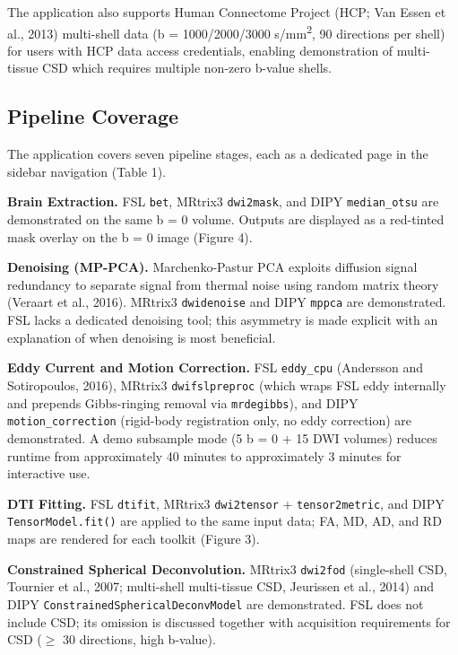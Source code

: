 \documentclass[12pt,a4paper]{article}
\begin{document}
The application also supports Human Connectome Project (HCP; Van Essen et al., 2013) multi-shell data (b = 1000/2000/3000 s/mm\textsuperscript{2}, 90 directions per shell) for users with HCP data access credentials, enabling demonstration of multi-tissue CSD which requires multiple non-zero b-value shells.

\subsection{Pipeline Coverage}\label{pipeline-coverage}

The application covers seven pipeline stages, each as a dedicated page in the sidebar navigation (Table 1).

\textbf{Brain Extraction.} FSL \texttt{bet}, MRtrix3 \texttt{dwi2mask}, and DIPY \texttt{median\_otsu} are demonstrated on the same b = 0 volume. Outputs are displayed as a red-tinted mask overlay on the b = 0 image (Figure 4).

\textbf{Denoising (MP-PCA).} Marchenko-Pastur PCA exploits diffusion signal redundancy to separate signal from thermal noise using random matrix theory (Veraart et al., 2016). MRtrix3 \texttt{dwidenoise} and DIPY \texttt{mppca} are demonstrated. FSL lacks a dedicated denoising tool; this asymmetry is made explicit with an explanation of when denoising is most beneficial.

\textbf{Eddy Current and Motion Correction.} FSL \texttt{eddy\_cpu} (Andersson and Sotiropoulos, 2016), MRtrix3 \texttt{dwifslpreproc} (which wraps FSL eddy internally and prepends Gibbs-ringing removal via \texttt{mrdegibbs}), and DIPY \texttt{motion\_correction} (rigid-body registration only, no eddy correction) are demonstrated. A demo subsample mode (5 b = 0 + 15 DWI volumes) reduces runtime from approximately 40 minutes to approximately 3 minutes for interactive use.

\textbf{DTI Fitting.} FSL \texttt{dtifit}, MRtrix3 \texttt{dwi2tensor} + \texttt{tensor2metric}, and DIPY \texttt{TensorModel.fit()} are applied to the same input data; FA, MD, AD, and RD maps are rendered for each toolkit (Figure 3).

\textbf{Constrained Spherical Deconvolution.} MRtrix3 \texttt{dwi2fod} (single-shell CSD, Tournier et al., 2007; multi-shell multi-tissue CSD, Jeurissen et al., 2014) and DIPY \texttt{ConstrainedSphericalDeconvModel} are demonstrated. FSL does not include CSD; its omission is discussed together with acquisition requirements for CSD ($\geq$ 30 directions, high b-value).
\end{document}
